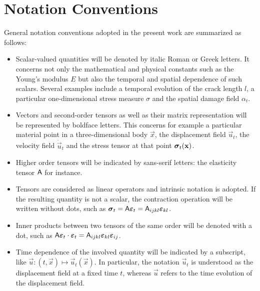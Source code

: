 \section*{Notation Conventions}
General notation conventions adopted in the present work are summarized as follows:
\begin{itemize}
\item Scalar-valued quantities will be denoted by italic Roman or Greek letters. It concerns not only the mathematical and physical constants such as the Young's modulus $E$ but also the temporal and spatial dependence of such scalars. Several examples include a temporal evolution of the crack length $l$, a particular one-dimensional stress measure $\sigma$ and the spatial damage field $\alpha_t$.

\item Vectors and second-order tensors as well as their matrix representation will be represented by boldface letters. This concerns for example a particular material point in a three-dimensional body $\vec{x}$, the displacement field $\vec{u}_t$, the velocity field $\dot{\vec{u}}_t$ and the stress tensor at that point $\sig_t(\vec{x})$.

\item Higher order tensors will be indicated by sans-serif letters: the elasticity tensor $\mathsf{A}$ for instance.

\item Tensors are considered as linear operators and intrinsic notation is adopted. If the resulting quantity is not a scalar, the contraction operation will be written without dots, such as $\sig_t=\tens{A}\eps_t=\tens{A}_{ijkl}\eps_{kl}$.

\item Inner products between two tensors of the same order will be denoted with a dot, such as $\tens{A}\eps_t\cdot\eps_t=\tens{A}_{ijkl}\eps_{kl}\eps_{ij}$.

\item Time dependence of the involved quantity will be indicated by a subscript, like $\vec{u}:(t,\vec{x})\mapsto\vec{u}_t(\vec{x})$. In particular, the notation $\vec{u}_t$ is understood as the displacement field at a fixed time $t$, whereas $\vec{u}$ refers to the time evolution of the displacement field.
\end{itemize}
